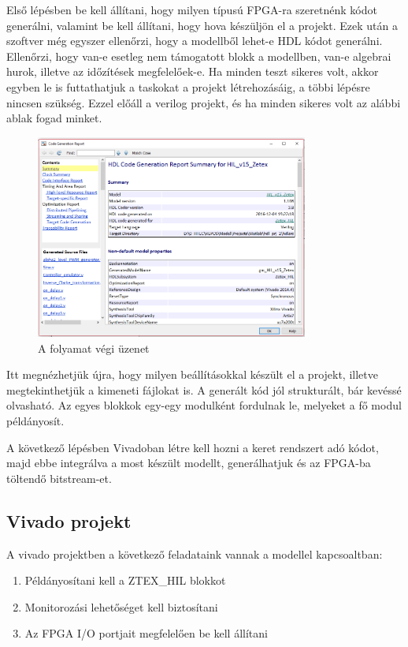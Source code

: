 Első lépésben be kell állítani, hogy milyen típusú FPGA-ra szeretnénk kódot generálni, valamint be kell állítani, hogy hova készüljön el a projekt. Ezek után a szoftver még egyszer ellenőrzi, hogy a modellből lehet-e HDL kódot generálni. Ellenőrzi, hogy van-e esetleg nem támogatott blokk a modellben, van-e algebrai hurok, illetve az időzítések megfelelőek-e. Ha minden teszt sikeres volt, akkor egyben le is futtathatjuk a taskokat a projekt létrehozásáig, a többi lépésre nincsen szükség. Ezzel előáll a verilog projekt, és ha minden sikeres volt az alábbi ablak fogad minket.

\begin{figure}[h!]
	\centering
	\includegraphics[width = 0.8\textwidth]{figures/hdl_report.png}
	\caption{A folyamat végi üzenet} 
	\label{fig:hdl_report}
\end{figure}

Itt megnézhetjük újra, hogy milyen beállításokkal készült el a projekt, illetve megtekinthetjük a kimeneti fájlokat is. A generált kód jól strukturált, bár kevéssé olvasható. Az egyes blokkok egy-egy modulként fordulnak le, melyeket a fő modul példányosít.

A következő lépésben Vivadoban létre kell hozni a keret rendszert adó kódot, majd ebbe integrálva a most készült modellt, generálhatjuk és az FPGA-ba töltendő bitstream-et.

\subsection{Vivado projekt}

A vivado projektben a következő feladataink vannak a modellel kapcsoaltban:
\begin{enumerate}
	\item{Példányosítani kell a ZTEX\_HIL blokkot}
	\item{Monitorozási lehetőséget kell biztosítani}
	\item{Az FPGA I/O portjait megfelelően be kell állítani}
\end{enumerate}

